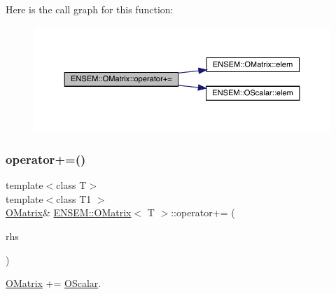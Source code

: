 Here is the call graph for this function\+:
\nopagebreak
\begin{figure}[H]
\begin{center}
\leavevmode
\includegraphics[width=350pt]{dd/d80/classENSEM_1_1OMatrix_ab488697fd72f3891fede3d00f8deb019_cgraph}
\end{center}
\end{figure}
\mbox{\label{classENSEM_1_1OMatrix_ab488697fd72f3891fede3d00f8deb019}} 
\subsubsection{\texorpdfstring{operator+=()}{operator+=()}\hspace{0.1cm}{\footnotesize\ttfamily [5/6]}}
{\footnotesize\ttfamily template$<$class T$>$ \\
template$<$class T1 $>$ \\
\mbox{\hyperlink{classENSEM_1_1OMatrix}{O\+Matrix}}\& \mbox{\hyperlink{classENSEM_1_1OMatrix}{E\+N\+S\+E\+M\+::\+O\+Matrix}}$<$ T $>$\+::operator+= (\begin{DoxyParamCaption}\item[{const \mbox{\hyperlink{classENSEM_1_1OScalar}{O\+Scalar}}$<$ T1 $>$ \&}]{rhs }\end{DoxyParamCaption})\hspace{0.3cm}{\ttfamily [inline]}}



\mbox{\hyperlink{classENSEM_1_1OMatrix}{O\+Matrix}} += \mbox{\hyperlink{classENSEM_1_1OScalar}{O\+Scalar}}. 

